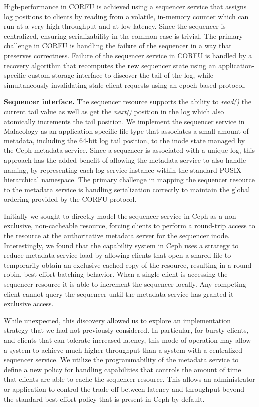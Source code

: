 \documentclass[preprint]{sigplanconf-eurosys}
\begin{document}
High-performance in CORFU is achieved using a sequencer service that assigns
log positions to clients by reading from a volatile, in-memory counter which
can run at a very high throughput and at low latency. Since the sequencer
is centralized, ensuring serializability in the common case is trivial.  The
primary challenge in CORFU is handling the failure of the sequencer in a way
that preserves correctness. Failure of the sequencer service in CORFU is
handled by a recovery algorithm that recomputes the new sequencer state using
an application-specific custom storage interface to discover the tail of the
log, while simultaneously invalidating stale client requests using an
epoch-based protocol.

{\bf Sequencer interface.} The sequencer resource supports the ability to
\emph{read()} the current tail value as well as get the \emph{next()} position in
the log which also atomically increments the tail position.
We implement the sequencer service in Malacology as an application-specific
file type that associates a small amount of metadata, including the 64-bit log
tail position, to the inode state managed by the Ceph metadata service. Since
a sequencer is associated with a unique log, this approach has the added
benefit of allowing the metadata service to also handle naming, by
representing each log service instance within the standard POSIX hierarchical
namespace. The primary challenge in mapping the sequencer resource to the
metadata service is handling serialization correctly to maintain the global
ordering provided by the CORFU protocol.

Initially we sought to directly model the sequencer service in Ceph as a
non-exclusive, non-cacheable resource, forcing clients to perform a round-trip
access to the resource at the authoritative metadata server for the sequencer
inode.  Interestingly, we found that the capability system in Ceph uses a
strategy to reduce metadata service load by allowing clients that open a
shared file to temporarily obtain an exclusive cached copy of the resource,
resulting in a round-robin, best-effort batching behavior. When a single
client is accessing the sequencer resource it is able to increment the
sequencer locally. Any competing client cannot query the sequencer until the
metadata service has granted it exclusive access.

While unexpected, this discovery allowed us to explore an implementation
strategy that we had not previously considered. In particular, for bursty
clients, and clients that can tolerate increased latency, this mode of
operation may allow a system to achieve much higher throughput than a system
with a centralized sequencer service.  We utilize the programmability of the
metadata service to define a new policy for handling capabilities that controls
the amount of time that clients are able to cache the sequencer resource. This
allows an administrator or application to control the trade-off between latency
and throughput beyond the standard best-effort policy that is present in Ceph
by default. 
\end{document}
